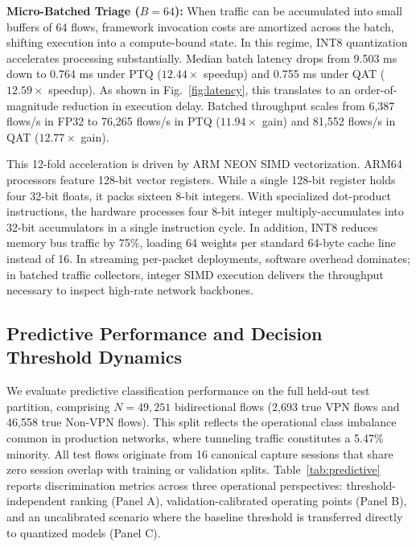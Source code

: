 \documentclass[conference]{IEEEtran}
\begin{document}
\textbf{Micro-Batched Triage ($B = 64$):} When traffic can be accumulated into small buffers of 64 flows, framework invocation costs are amortized across the batch, shifting execution into a compute-bound state. In this regime, INT8 quantization accelerates processing substantially. Median batch latency drops from 9.503 ms down to 0.764 ms under PTQ ($12.44\times$ speedup) and 0.755 ms under QAT ($12.59\times$ speedup). As shown in Fig.~\ref{fig:latency}, this translates to an order-of-magnitude reduction in execution delay. Batched throughput scales from 6,387 flows/s in FP32 to 76,265 flows/s in PTQ ($11.94\times$ gain) and 81,552 flows/s in QAT ($12.77\times$ gain).

This 12-fold acceleration is driven by ARM NEON SIMD vectorization. ARM64 processors feature 128-bit vector registers. While a single 128-bit register holds four 32-bit floats, it packs sixteen 8-bit integers. With specialized dot-product instructions, the hardware processes four 8-bit integer multiply-accumulates into 32-bit accumulators in a single instruction cycle. In addition, INT8 reduces memory bus traffic by 75\%, loading 64 weights per standard 64-byte cache line instead of 16. In streaming per-packet deployments, software overhead dominates; in batched traffic collectors, integer SIMD execution delivers the throughput necessary to inspect high-rate network backbones.

\subsection{Predictive Performance and Decision Threshold Dynamics}

We evaluate predictive classification performance on the full held-out test partition, comprising $N = 49,251$ bidirectional flows (2,693 true VPN flows and 46,558 true Non-VPN flows). This split reflects the operational class imbalance common in production networks, where tunneling traffic constitutes a 5.47\% minority. All test flows originate from 16 canonical capture sessions that share zero session overlap with training or validation splits. Table~\ref{tab:predictive} reports discrimination metrics across three operational perspectives: threshold-independent ranking (Panel A), validation-calibrated operating points (Panel B), and an uncalibrated scenario where the baseline threshold is transferred directly to quantized models (Panel C).
\end{document}
